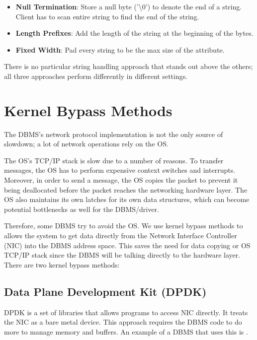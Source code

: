 \documentclass[11pt]{article}
\begin{document}
\begin{itemize}
    \item \textbf{Null Termination}:
    Store a null byte ('\textbackslash 0') to denote the end of a 
    string. Client has to scan entire string to find the end of the string.
    
    \item \textbf{Length Prefixes}:
    Add the length of the string at the beginning of the bytes.
    
    \item \textbf{Fixed Width}:
    Pad every string to be the max size of the attribute.
\end{itemize}

There is no particular string handling approach that stands out above the others; all three 
approaches perform differently in different settings.

\section{Kernel Bypass Methods}
The DBMS's network protocol implementation is not the only source of slowdown; a lot of network 
operations rely on the OS. 

The OS's TCP/IP stack is slow due to a number of reasons. To transfer messages, the OS has to 
perform expensive context switches and interrupts. Moreover, in order to send a message, the OS 
copies the packet to prevent it being deallocated before the packet reaches the networking hardware 
layer. The OS also maintains its own latches for its own data structures, which can become potential 
bottlenecks as well for the DBMS/driver.

Therefore, some DBMS try to avoid the OS. We use kernel bypass methods to allows the 
system to get data directly from the Network Interface Controller (NIC) into the DBMS address space. 
This saves the need for data copying or OS TCP/IP stack since the DBMS will be talking directly to 
the hardware layer. There are two kernel bypass methods:

\subsection*{Data Plane Development Kit (DPDK)}
DPDK is a set of libraries that allows programs to access NIC directly. It treats the NIC as a 
bare metal device. This approach requires the DBMS code to do more to manage memory and buffers. An 
example of a DBMS that uses this is .
\end{document}
